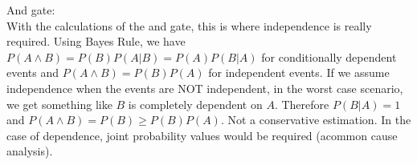And gate: \\
With the calculations of the and gate, this is where independence is really required. Using Bayes Rule, we have $P(A \land B) = P(B)P(A|B) = P(A)P(B|A)$ for conditionally dependent events and $P(A \land B) = P(B)P(A)$ for independent events. If we assume independence when the events are NOT independent, in the worst case scenario, we get something like $B$ is completely dependent on $A$. Therefore $P(B|A) = 1$ and $P(A \land B) = P(B) \geq P(B)P(A)$. Not a conservative estimation. In the case of dependence, joint probability values would be required (acommon cause analysis).  \\







